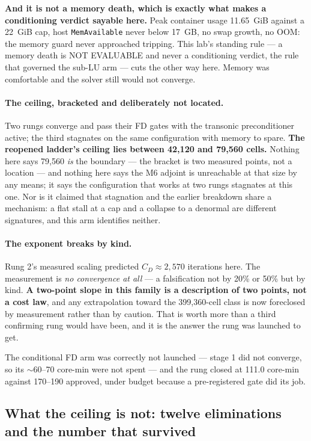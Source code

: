 \documentclass[11pt,a4paper]{article}
\begin{document}
\textbf{And it is not a memory death, which is exactly what makes a conditioning verdict
sayable here.} Peak container usage 11.65~GiB against a 22~GiB cap, host \texttt{MemAvailable}
never below 17~GB, no swap growth, no OOM: the memory guard never approached tripping. This
lab's standing rule --- a memory death is NOT EVALUABLE and never a conditioning verdict, the
rule that governed the sub-LU arm --- cuts the other way here. Memory was comfortable and the
solver still would not converge.

\paragraph{The ceiling, bracketed and deliberately not located.} Two rungs converge and pass
their FD gates with the transonic preconditioner active; the third stagnates on the same
configuration with memory to spare. \textbf{The reopened ladder's ceiling lies between 42{,}120
and 79{,}560 cells.} Nothing here says 79{,}560 \emph{is} the boundary --- the bracket is two
measured points, not a location --- and nothing here says the M6 adjoint is unreachable at that
size by any means; it says the configuration that works at two rungs stagnates at this one.
Nor is it claimed that stagnation and the earlier breakdown share a mechanism: a flat stall at
a cap and a collapse to a denormal are different signatures, and this arm identifies neither.

\paragraph{The exponent breaks by kind.} Rung 2's measured scaling predicted
\(C_D\approx2{,}570\) iterations here. The measurement is \emph{no convergence at all} --- a
falsification not by 20\% or 50\% but by kind. \textbf{A two-point slope in this family is a
description of two points, not a cost law}, and any extrapolation toward the 399{,}360-cell
class is now foreclosed by measurement rather than by caution. That is worth more than a third
confirming rung would have been, and it is the answer the rung was launched to get.

The conditional FD arm was correctly not launched --- stage 1 did not converge, so its
\(\sim\)60--70 core-min were not spent --- and the rung closed at 111.0 core-min against
170--190 approved, under budget because a pre-registered gate did its job.

\subsection{What the ceiling is not: twelve eliminations and the number that survived}
\label{sec:elimination}
\end{document}
